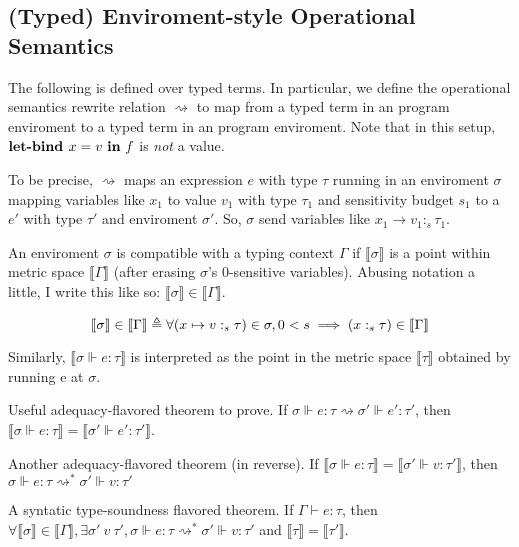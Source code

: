 \subsection{(Typed) Enviroment-style Operational Semantics}
The following is defined over typed terms. In particular, we define the
operational semantics rewrite relation $\rightsquigarrow$ to map from a typed
term in an program enviroment to a typed term in an program enviroment. Note
that in this setup, $\textbf{let-bind } x = v \ \textbf{in} \ f$ is \textit{not} a value.

To be precise, $\rightsquigarrow$ maps an expression $e$ with type $\tau$
running in an enviroment $\sigma$ mapping variables like $x_1$ to value $v_1$
with type $\tau_1$ and sensitivity budget $s_1$ to a $e'$ with type $\tau'$ and
enviroment $\sigma'$.
So, $\sigma$ send variables like $x_1 \to v_1 :_s \tau_1$.

An enviroment $\sigma$ is compatible with a typing context $\Gamma$ if
$\llbracket \sigma \rrbracket$ is a point within metric space $\llbracket \Gamma
\rrbracket$ (after erasing $\sigma$'s $0$-sensitive variables). Abusing notation
a little, I write this like so: $\llbracket \sigma \rrbracket \in \llbracket
\Gamma \rrbracket$.

\begin{equation*}
  \llbracket \sigma \rrbracket \in \llbracket \Gamma \rrbracket 
  \triangleq \forall
  \\ 
  (x \mapsto v :_s \tau) \in \sigma, 0 < s \implies (x :_s \tau) \in \llbracket
  \Gamma \rrbracket
\end{equation*}

Similarly, $\llbracket \sigma \Vdash e : \tau \rrbracket$ is
interpreted as the point in the metric space $\llbracket \tau \rrbracket$
obtained by running e at $\sigma$.

Useful adequacy-flavored theorem to prove. If $\sigma \Vdash e : \tau \rightsquigarrow \sigma'
\Vdash e' : \tau'$, then $\llbracket \sigma \Vdash e : \tau \rrbracket =
\llbracket \sigma' \Vdash e' : \tau' \rrbracket$.

Another adequacy-flavored theorem (in reverse). If $\llbracket \sigma \Vdash e :
\tau \rrbracket = \llbracket \sigma' \Vdash v : \tau' \rrbracket$, then $\sigma
\Vdash e : \tau \rightsquigarrow^{*} \sigma' \Vdash v : \tau'$

A syntatic type-soundness flavored theorem. If $\Gamma \vdash e : \tau$, then
$\forall \llbracket \sigma \rrbracket \in \llbracket \Gamma \rrbracket, \exists
\sigma' \ v \ \tau', \sigma \Vdash e : \tau \rightsquigarrow^{*} \sigma' \Vdash v :
\tau'$ and $\llbracket \tau \rrbracket = \llbracket \tau' \rrbracket$.


